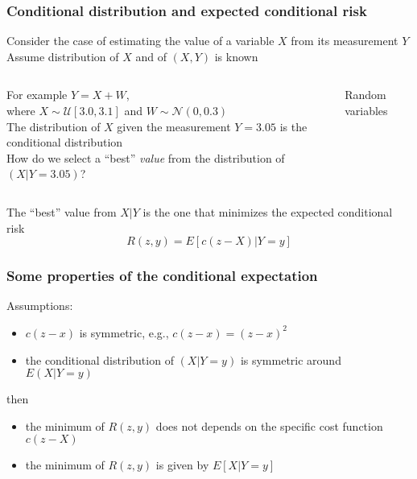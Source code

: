 \begin{frame}
	\frametitle{Conditional distribution and expected conditional risk}
	Consider the case of estimating the value of a variable $X$ from its measurement $Y$
	Assume distribution of $X$ and of $(X,Y)$ is known
	\begin{columns}
		For example $Y=X+W$,\\ where $X\sim \mathcal{U}[3.0, 3.1]$ and $W\sim\mathcal{N}(0, 0.3)$\\\vspace{0.5em}
		The distribution of $X$ given the measurement $Y=3.05$ is the conditional distribution\\\vspace{0.5em}
		\onslide<2->
		How do we select a ``best'' \emph{value} from the distribution of $(X|Y=3.05)$?
		
		\begin{block}{Random variables}
		\end{block}
	\end{columns}
	\vspace{1em}
	
	The ``best'' value from $X|Y$ is the one that minimizes the expected conditional risk	$$R(z,y)=E[c(z-X)|Y=y]$$
\end{frame}

\begin{frame}
	\frametitle{Some properties of the conditional expectation}
	Assumptions:
	\begin{itemize}
		\item $c(z-x)$ is symmetric, e.g., $c(z-x)=(z-x)^2$
		\item the conditional distribution of $(X|Y=y)$ is symmetric around $E(X|Y=y)$
	\end{itemize}\vspace{1em}
	then
	\begin{itemize}
		\item the minimum of $R(z,y)$ does not depends on the specific cost function $c(z-X)$
		\item the minimum of $R(z,y)$ is given by $E[X|Y=y]$
	\end{itemize}\vspace{1.5 em}
		
\end{frame}